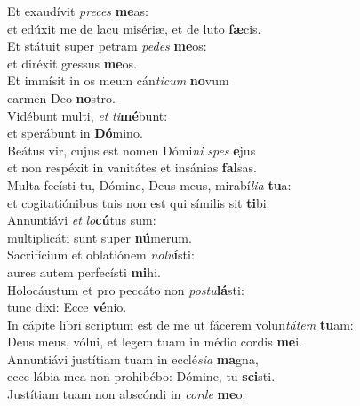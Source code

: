 \evenverse Et exaudívit \textit{pre}\textit{ces} \textbf{me}as:~\*\\
\evenverse et edúxit me de lacu misériæ, et de luto \textbf{fæ}cis.\\
\oddverse Et státuit super petram \textit{pe}\textit{des} \textbf{me}os:~\*\\
\oddverse et diréxit gressus \textbf{me}os.\\
\evenverse Et immísit in os meum cán\textit{ti}\textit{cum} \textbf{no}vum~\*\\
\evenverse carmen Deo \textbf{no}stro.\\
\oddverse Vidébunt multi, \textit{et} \textit{ti}\textbf{mé}bunt:~\*\\
\oddverse et sperábunt in \textbf{Dó}mino.\\
\evenverse Beátus vir, cujus est nomen Dómi\textit{ni} \textit{spes} \textbf{e}jus~\*\\
\evenverse et non respéxit in vanitátes et insánias \textbf{fal}sas.\\
\oddverse Multa fecísti tu, Dómine, Deus meus, mirabí\textit{li}\textit{a} \textbf{tu}a:~\*\\
\oddverse et cogitatiónibus tuis non est qui símilis sit \textbf{ti}bi.\\
\evenverse Annuntiávi \textit{et} \textit{lo}\textbf{cú}tus sum:~\*\\
\evenverse multiplicáti sunt super \textbf{nú}merum.\\
\oddverse Sacrifícium et oblatiónem \textit{no}\textit{lu}\textbf{í}sti:~\*\\
\oddverse aures autem perfecísti \textbf{mi}hi.\\
\evenverse Holocáustum et pro peccáto non \textit{po}\textit{stu}\textbf{lá}sti:~\*\\
\evenverse tunc dixi: Ecce \textbf{vé}nio.\\
\oddverse In cápite libri scriptum est de me ut fácerem volun\textit{tá}\textit{tem} \textbf{tu}am:~\*\\
\oddverse Deus meus, vólui, et legem tuam in médio cordis \textbf{me}i.\\
\evenverse Annuntiávi justítiam tuam in ecclé\textit{si}\textit{a} \textbf{ma}gna,~\*\\
\evenverse ecce lábia mea non prohibébo: Dómine, tu \textbf{sci}sti.\\
\oddverse Justítiam tuam non abscóndi in \textit{cor}\textit{de} \textbf{me}o:~\*\\
